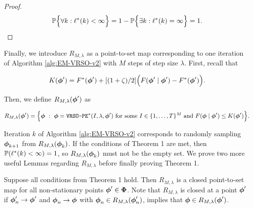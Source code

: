 \begin{proof}
\begin{equation*}
    \mathbb{P}\Big\{\forall k : \ell^*(k) < \infty \Big\} = 1 - \mathbb{P}\Big\{\exists k : \ell^*(k) = \infty \Big\} = 1.
\end{equation*}
\end{proof}

Finally, we introduce $R_{M,\lambda}$ as a point-to-set map corresponding to one iteration of Algorithm \ref{alg:EM-VRSO-v2} with $M$ steps of step size $\lambda$. First, recall that

\begin{equation}
    K(\boldsymbol{\phi}') = F^*(\boldsymbol{\phi}') + [(1 + \zeta)/2] \Big(F(\boldsymbol{\phi}' \mid \boldsymbol{\phi}') - F^*(\boldsymbol{\phi}') \Big). 
\end{equation}

Then, we define $R_{M,\lambda}(\boldsymbol{\phi}')$ as

\begin{equation}
    R_{M,\lambda}(\boldsymbol{\phi}') = \Big\{\boldsymbol{\phi} ~ : ~ \boldsymbol{\phi} = \texttt{VRSO-PE}^*(I,\lambda,\boldsymbol{\phi}') ~ \text{for some} ~ I \in \{1,\ldots,T\}^M ~\text{and}~ F(\boldsymbol{\phi} \mid \boldsymbol{\phi}') \leq K(\boldsymbol{\phi}')\Big\}.
\end{equation}

Iteration $k$ of Algorithm \ref{alg:EM-VRSO-v2} corresponds to randomly sampling $\boldsymbol{\phi}_{k+1}$ from $R_{M,\lambda}(\boldsymbol{\phi}_k)$. If the conditions of Theorem 1 are met, then $\mathbb{P}(\ell^*(k) < \infty) = 1$, so $R_{M,\lambda}(\boldsymbol{\phi}_k)$ must not be the empty set. We prove two more useful Lemmas regarding $R_{M,\lambda}$ before finally proving Theorem 1.

\begin{lemma}
    Suppose all conditions from Theorem 1 hold. Then $R_{M,\lambda}$ is a closed point-to-set map for all non-stationary points $\boldsymbol{\phi}' \in \boldsymbol{\Phi}$. Note that $R_{M,\lambda}$ is closed at a point $\boldsymbol{\phi}'$ if $\boldsymbol{\phi}'_{n} \to \boldsymbol{\phi}'$ and $\boldsymbol{\phi}_{n} \to \boldsymbol{\phi}$ with $\boldsymbol{\phi}_{n} \in R_{M,\lambda}(\boldsymbol{\phi}'_{n})$, implies that $\boldsymbol{\phi} \in R_{M,\lambda}(\boldsymbol{\phi}')$. 
\end{lemma}

